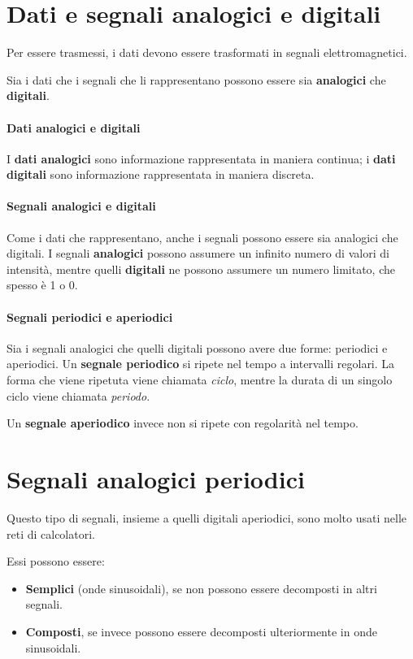 \section{Dati e segnali analogici e digitali}
    Per essere trasmessi, i dati devono essere trasformati in segnali elettromagnetici.
    
    Sia i dati che i segnali che li rappresentano possono essere sia \textbf{analogici} che \textbf{digitali}.
    
    \paragraph{Dati analogici e digitali}
        I \textbf{dati analogici} sono informazione rappresentata in maniera continua; i \textbf{dati digitali} sono informazione rappresentata in maniera discreta.
        
    \paragraph{Segnali analogici e digitali}
        Come i dati che rappresentano, anche i segnali possono essere sia analogici che digitali. I segnali \textbf{analogici} possono assumere un infinito numero di valori di intensità, mentre quelli \textbf{digitali} ne possono assumere un numero limitato, che spesso è 1 o 0.
        
    \paragraph{Segnali periodici e aperiodici}
        Sia i segnali analogici che quelli digitali possono avere due forme: periodici e aperiodici. Un \textbf{segnale periodico} si ripete nel tempo a intervalli regolari. La forma che viene ripetuta viene chiamata \textit{ciclo}, mentre la durata di un singolo ciclo viene chiamata \textit{periodo}.
        
        Un \textbf{segnale aperiodico} invece non si ripete con regolarità nel tempo.
        
\section{Segnali analogici periodici}
    Questo tipo di segnali, insieme a quelli digitali aperiodici, sono molto usati nelle reti di calcolatori.
    
    Essi possono essere:
    \begin{itemize}
        \item \textbf{Semplici} (onde sinusoidali), se non possono essere decomposti in altri segnali.
        \item \textbf{Composti}, se invece possono essere decomposti ulteriormente in onde sinusoidali.
    \end{itemize}
    
